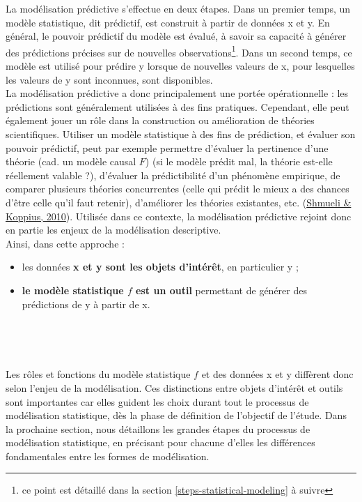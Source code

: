 \documentclass[12pt,twoside]{reedthesis}
\providecommand{\tightlist}{%
  \setlength{\itemsep}{0pt}\setlength{\parskip}{0pt}}
\begin{document}
La modélisation prédictive s'effectue en deux étapes. Dans un premier temps, un modèle statistique, dit prédictif, est construit à partir de données x et y. En général, le pouvoir prédictif du modèle est évalué, à savoir sa capacité à générer des prédictions précises sur de nouvelles observations\footnote{ce point est détaillé dans la section \ref{steps-statistical-modeling} à suivre}. Dans un second temps, ce modèle est utilisé pour prédire y lorsque de nouvelles valeurs de x, pour lesquelles les valeurs de y sont inconnues, sont disponibles.\\

La modélisation prédictive a donc principalement une portée opérationnelle : les prédictions sont généralement utilisées à des fins pratiques. Cependant, elle peut également jouer un rôle dans la construction ou amélioration de théories scientifiques. Utiliser un modèle statistique à des fins de prédiction, et évaluer son pouvoir prédictif, peut par exemple permettre d'évaluer la pertinence d'une théorie (cad. un modèle causal \(F\)) (si le modèle prédit mal, la théorie est-elle réellement valable ?), d'évaluer la prédictibilité d'un phénomène empirique, de comparer plusieurs théories concurrentes (celle qui prédit le mieux a des chances d'être celle qu'il faut retenir), d'améliorer les théories existantes, etc. (\protect\hyperlink{ref-shmueli_predictive_2010}{Shmueli \& Koppius, 2010}). Utilisée dans ce contexte, la modélisation prédictive rejoint donc en partie les enjeux de la modélisation descriptive.\\

Ainsi, dans cette approche :
\begin{itemize}
\tightlist
\item
  les données \textbf{x et y sont les objets d'intérêt}, en particulier y ;
\item
  \textbf{le modèle statistique \(f\) est un outil} permettant de générer des prédictions de y à partir de x.\\
  \strut \\
  \strut \\
\end{itemize}
Les rôles et fonctions du modèle statistique \(f\) et des données x et y diffèrent donc selon l'enjeu de la modélisation. Ces distinctions entre objets d'intérêt et outils sont importantes car elles guident les choix durant tout le processus de modélisation statistique, dès la phase de définition de l'objectif de l'étude. Dans la prochaine section, nous détaillons les grandes étapes du processus de modélisation statistique, en précisant pour chacune d'elles les différences fondamentales entre les formes de modélisation.
\end{document}
